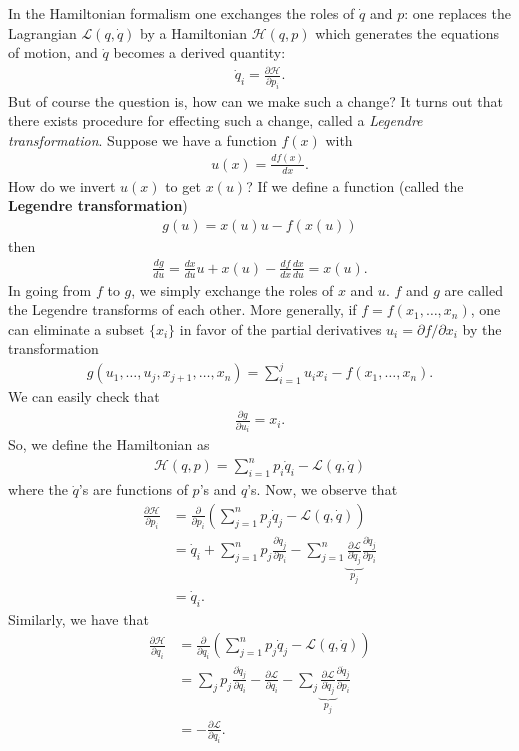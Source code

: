 \documentclass{book}
\theoremstyle{definition}
\newcommand{\p}{\partial}
\newcommand{\lag}{\mathcal{L}}
\newcommand{\ham}{\mathcal{H}}
\newcommand{\f}[2]{\frac{#1}{#2}}
\newcommand{\lp}{\left(}
\newcommand{\rp}{\right)}
\begin{document}
In the Hamiltonian formalism one exchanges the roles of $\dot{q}$ and $p$: one replaces the Lagrangian $\lag(q,\dot{q})$ by a Hamiltonian $\ham(q,p)$ which generates the equations of motion, and $\dot{q}$ becomes a derived quantity:
\begin{align}
\dot{q}_i = \f{\p \ham}{\p p_i}.
\end{align}
But of course the question is, how can we make such a change? It turns out that there exists procedure for effecting such a change, called a \textit{Legendre transformation}. Suppose we have a function $f(x)$ with
\begin{align}
u(x) = \f{df(x)}{dx}.
\end{align}
How do we invert $u(x)$ to get $x(u)$? If we define a function (called the \textbf{Legendre transformation})
\begin{align}
\boxed{g(u) = x(u)u - f(x(u))}
\end{align}
then
\begin{align}
\f{dg}{du} = \f{dx}{du}u + x(u) - \f{df}{dx}\f{dx}{du} = x(u).
\end{align}
In going from $f$ to $g$, we simply exchange the roles of $x$ and $u$. $f$ and $g$ are called the Legendre transforms of each other. More generally, if $f = f(x_1,\dots,x_n)$, one can eliminate a subset $\{x_i\}$ in favor of the partial derivatives $u_i = \p f/\p x_i$ by the transformation
\begin{align}
g(u_1,\dots,u_j,x_{j+1},\dots,x_{n}) = \sum^j_{i=1}u_ix_i - f(x_1,\dots,x_n).
\end{align}
We can easily check that 
\begin{align}
\f{\p g}{\p u_i} = x_i.
\end{align}
So, we define the Hamiltonian as
\begin{align}
\boxed{\ham(q,p) = \sum^n_{i=1}p_i \dot{q}_i - \lag(q,\dot{q})}
\end{align}
where the $\dot{q}$'s are functions of $p$'s and $q$'s. Now, we observe that
\begin{align}
\f{\p \ham}{\p p_i} &= \f{\p }{\p p_i}\lp \sum^n_{j=1}p_j \dot{q}_j - \lag(q,\dot{q})  \rp\\
&= \dot{q}_i + \sum_{j=1}^n p_j \f{\p \dot{q}_j}{\p p_i} - \sum_{j=1}^n \underbrace{\f{\p \lag}{\p \dot{q}_j}}_{p_j}\f{\p \dot{q}_j}{\p p_i}\\
&= \dot{q}_i.
\end{align}
Similarly, we have that
\begin{align}
\f{\p \ham}{\p q_i} &= \f{\p }{\p q_i}\lp \sum^n_{j=1}p_j \dot{q}_j - \lag(q,\dot{q})  \rp\\
&= \sum_j p_j\f{\p \dot{q}_j}{\p q_i} - \f{\p \lag}{\p q_i} 
- \sum_j \underbrace{\f{\p \lag}{\p \dot{q}_j}}_{p_j}\f{\p \dot{q}_j}{\p p_i}
\\
&=-\f{\p \lag}{\p q_i}.
\end{align}
\end{document}
